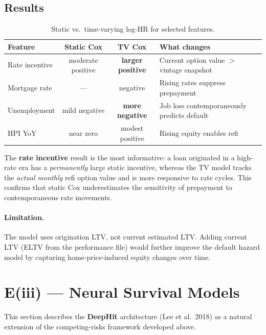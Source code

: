 \documentclass[11pt,a4paper]{article}
\begin{document}
\subsection{Results}

\begin{table}[h]
\centering
\caption{Static vs.\ time-varying log-HR for selected features.}
\label{tab:tv_compare}
\small
\begin{tabular}{lccl}
\toprule
\textbf{Feature} & \textbf{Static Cox} & \textbf{TV Cox} & \textbf{What changes} \\
\midrule
Rate incentive & moderate positive & \textbf{larger positive} &
  Current option value $>$ vintage snapshot \\
Mortgage rate  & --- & negative & Rising rates suppress prepayment \\
Unemployment   & mild negative & \textbf{more negative} &
  Job loss contemporaneously predicts default \\
HPI YoY        & near zero & modest positive & Rising equity enables refi \\
\bottomrule
\end{tabular}
\end{table}

The \textbf{rate incentive} result is the most informative: a loan
originated in a high-rate era has a \emph{permanently} large static
incentive, whereas the TV model tracks the \emph{actual monthly} refi
option value and is more responsive to rate cycles.  This confirms that
static Cox underestimates the sensitivity of prepayment to contemporaneous
rate movements.

\paragraph{Limitation.} The model uses origination LTV, not current
estimated LTV.  Adding current LTV (ELTV from the performance file) would
further improve the default hazard model by capturing home-price-induced
equity changes over time.

\section{E(iii) --- Neural Survival Models}

This section describes the \textbf{DeepHit} architecture
(Lee et al.\ 2018) as a natural extension of the competing-risks
framework developed above.
\end{document}

